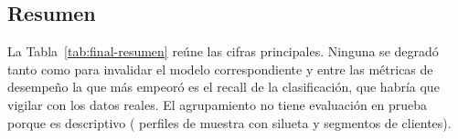 \subsection{Resumen}

La Tabla~\ref{tab:final-resumen} reúne las cifras principales. Ninguna se
degradó tanto como para invalidar el modelo correspondiente y entre las
métricas de desempeño la que más empeoró es el recall de la clasificación,
que habría que vigilar con los datos reales. El agrupamiento no tiene
evaluación en prueba porque es descriptivo (\FinAgrK{} perfiles de muestra
con silueta \FinAgrSilueta{} y \FinAgrSegmentos{} segmentos de clientes).

\begin{table}[!htbp]
\centering
\small
{}
\caption{Resumen final de validación (o desarrollo, en Bayes) frente a
prueba.}
\label{tab:final-resumen}
\end{table}
